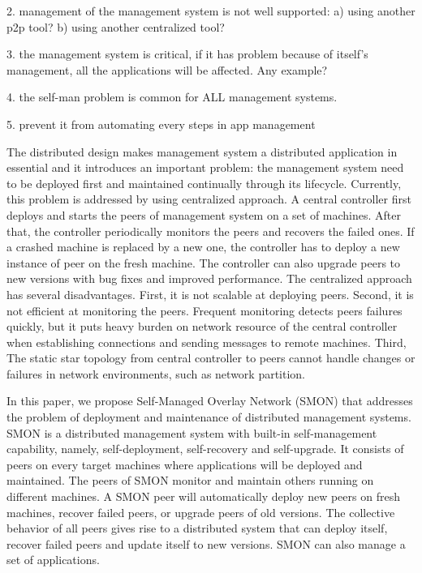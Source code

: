 2. management of the management system is not well
supported: a) using another p2p tool? b) using another
centralized tool?

3. the management system is critical, if it has problem
because of itself's management, all the applications will be
affected. Any example?

4. the self-man problem is common for ALL management
systems.

5. prevent it from automating every steps in app management


The distributed design makes management system a distributed
application in essential and it introduces an important
problem: the management system need to be deployed first and
maintained continually through its lifecycle. Currently,
this problem is addressed by using centralized approach. A
central controller first deploys and starts the peers of
management system on a set of machines. After that, the
controller periodically monitors the peers and recovers the
failed ones. If a crashed machine is replaced by a new one,
the controller has to deploy a new instance of peer on the
fresh machine. The controller can also upgrade peers to new
versions with bug fixes and improved performance. The
centralized approach has several disadvantages. First, it is
not scalable at deploying peers. Second, it is not efficient
at monitoring the peers. Frequent monitoring detects peers
failures quickly, but it puts heavy burden on network
resource of the central controller when establishing
connections and sending messages to remote machines. Third,
The static star topology from central controller to peers
cannot handle changes or failures in network
environments, such as network partition.

In this paper, we propose Self-Managed Overlay Network
(SMON) that addresses the problem of deployment and
maintenance of distributed management systems.  SMON is a
distributed management system with built-in self-management
capability, namely, self-deployment, self-recovery and
self-upgrade. It consists of peers on every target machines
where applications will be deployed and maintained. The
peers of SMON monitor and maintain others running on
different machines. A SMON peer will automatically deploy
new peers on fresh machines, recover failed peers, or
upgrade peers of old versions. The collective behavior of
all peers gives rise to a distributed system that can deploy
itself, recover failed peers and update itself to new
versions. SMON can also manage a set of applications.

